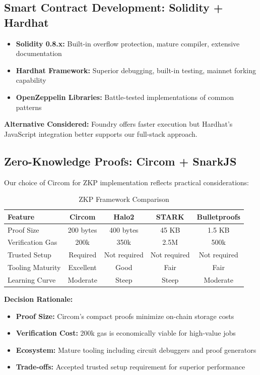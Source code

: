 \subsection{Smart Contract Development: Solidity + Hardhat}

\begin{itemize}
    \item \textbf{Solidity 0.8.x:} Built-in overflow protection, mature compiler, extensive documentation
    \item \textbf{Hardhat Framework:} Superior debugging, built-in testing, mainnet forking capability
    \item \textbf{OpenZeppelin Libraries:} Battle-tested implementations of common patterns
\end{itemize}

\textbf{Alternative Considered:} Foundry offers faster execution but Hardhat's JavaScript integration better supports our full-stack approach.

\subsection{Zero-Knowledge Proofs: Circom + SnarkJS}

Our choice of Circom for ZKP implementation reflects practical considerations:

\begin{table}[h]
\centering
\caption{ZKP Framework Comparison}
\label{tab:zkp-comparison}
\begin{tabular}{lcccc}
\toprule
\textbf{Feature} & \textbf{Circom} & \textbf{Halo2} & \textbf{STARK} & \textbf{Bulletproofs} \\
\midrule
Proof Size & 200 bytes & 400 bytes & 45 KB & 1.5 KB \\
Verification Gas & 200k & 350k & 2.5M & 500k \\
Trusted Setup & Required & Not required & Not required & Not required \\
Tooling Maturity & Excellent & Good & Fair & Fair \\
Learning Curve & Moderate & Steep & Steep & Moderate \\
\bottomrule
\end{tabular}
\end{table}

\textbf{Decision Rationale:}
\begin{itemize}
    \item \textbf{Proof Size:} Circom's compact proofs minimize on-chain storage costs
    \item \textbf{Verification Cost:} 200k gas is economically viable for high-value jobs
    \item \textbf{Ecosystem:} Mature tooling including circuit debuggers and proof generators
    \item \textbf{Trade-offs:} Accepted trusted setup requirement for superior performance
\end{itemize}

